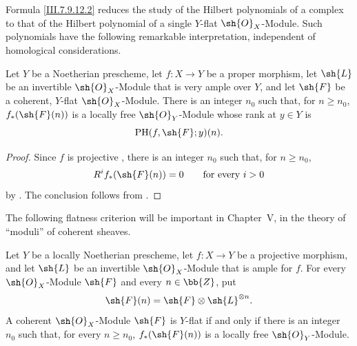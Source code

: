 Formula \eqref{III.7.9.12.2} reduces the study of the
Hilbert polynomials of a complex to that of the Hilbert
polynomial of a single $Y$-flat $\sh{O}_X$-Module.  Such
polynomials have the following remarkable interpretation,
independent of homological considerations.

\begin{corollary}[7.9.13]
\label{III.7.9.13}
Let $Y$ be a Noetherian prescheme, let $f:X\to Y$ be a
proper morphism, let $\sh{L}$ be an invertible
$\sh{O}_X$-Module that is very ample over $Y$, and let
$\sh{F}$ be a coherent, $Y$-flat $\sh{O}_X$-Module.  There
is an integer $n_0$ such that, for $n\geq n_0$,
$f_*(\sh{F}(n))$ is a locally free $\sh{O}_Y$-Module whose
rank at $y\in Y$ is
\[
  \operatorname{PH}(f,\sh{F};y)(n).
\]
\end{corollary}

\begin{proof}
Since $f$ is projective , there is an
integer $n_0$ such that, for $n\geq n_0$,
\[
  R^if_*(\sh{F}(n))=0
  \qquad\text{for every $i>0$}
\]
by .  The conclusion follows from
.
\end{proof}

The following flatness criterion will be important in
Chapter~V, in the theory of ``moduli'' of coherent
sheaves.

\begin{proposition}[7.9.14]
\label{III.7.9.14}
Let $Y$ be a locally Noetherian prescheme, let
$f:X\to Y$ be a projective morphism, and let $\sh{L}$ be
an invertible $\sh{O}_X$-Module that is ample for $f$.
For every $\sh{O}_X$-Module $\sh{F}$ and every
$n\in\bb{Z}$, put
\[
  \sh{F}(n)=\sh{F}\otimes\sh{L}^{\otimes n}.
\]
A coherent $\sh{O}_X$-Module $\sh{F}$ is $Y$-flat if and
only if there is an integer $n_0$ such that, for every
$n\geq n_0$, $f_*(\sh{F}(n))$ is a locally free
$\sh{O}_Y$-Module.
\end{proposition}

